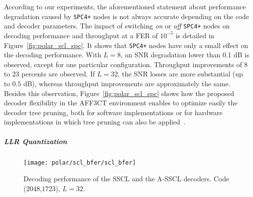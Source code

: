 According to our experiments, the aforementioned statement about performance
degradation caused by \texttt{SPC4+} nodes is not always accurate depending on
the code and decoder parameters. The impact of switching \textit{on} or
\textit{off} \texttt{SPC4+} nodes on decoding performance and throughput at a
FER of $10^{-5}$ is detailed in Figure~\ref{fig:polar_scl_spc}. It shows that
\texttt{SPC4+} nodes have only a small effect on the decoding performance. With
$L=8$, an SNR degradation lower than 0.1 dB is observed, except for one
particular configuration. Throughput improvements of $8$ to $23$ percents are
observed. If $L=32$, the SNR losses are more substantial (up to $0.5$ dB),
whereas throughput improvements are approximately the same. Besides this
observation, Figure~\ref{fig:polar_scl_spc} shows how the proposed decoder
flexibility in the AFF3CT environment enables to optimize easily the decoder
tree pruning, both for software implementations or for hardware implementations
in which tree pruning can also be applied~\cite{Lin2014}.

\subparagraph{LLR Quantization}

\begin{figure}
  \centering
  \texttt{[image: polar/scl\_bfer/scl\_bfer]}
  \caption{Decoding performance of the SSCL and the A-SSCL decoders.
    Code ($2048$,$1723$), $L=32$.}
  \label{plot:polar_scl_bfer}
\end{figure}

